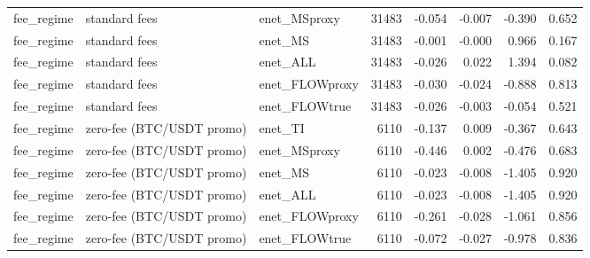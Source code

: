 \begin{tabular}{lllrrrrr}
fee_regime & standard fees & enet_MSproxy & 31483 & -0.054 & -0.007 & -0.390 & 0.652 \\
fee_regime & standard fees & enet_MS & 31483 & -0.001 & -0.000 & 0.966 & 0.167 \\
fee_regime & standard fees & enet_ALL & 31483 & -0.026 & 0.022 & 1.394 & 0.082 \\
fee_regime & standard fees & enet_FLOWproxy & 31483 & -0.030 & -0.024 & -0.888 & 0.813 \\
fee_regime & standard fees & enet_FLOWtrue & 31483 & -0.026 & -0.003 & -0.054 & 0.521 \\
fee_regime & zero-fee (BTC/USDT promo) & enet_TI & 6110 & -0.137 & 0.009 & -0.367 & 0.643 \\
fee_regime & zero-fee (BTC/USDT promo) & enet_MSproxy & 6110 & -0.446 & 0.002 & -0.476 & 0.683 \\
fee_regime & zero-fee (BTC/USDT promo) & enet_MS & 6110 & -0.023 & -0.008 & -1.405 & 0.920 \\
fee_regime & zero-fee (BTC/USDT promo) & enet_ALL & 6110 & -0.023 & -0.008 & -1.405 & 0.920 \\
fee_regime & zero-fee (BTC/USDT promo) & enet_FLOWproxy & 6110 & -0.261 & -0.028 & -1.061 & 0.856 \\
fee_regime & zero-fee (BTC/USDT promo) & enet_FLOWtrue & 6110 & -0.072 & -0.027 & -0.978 & 0.836 \\
\bottomrule
\end{tabular}
